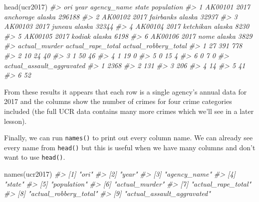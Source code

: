 \documentclass[
  12pt,
  openany]{book}
\newenvironment{Shaded}{\begin{snugshade}}{\end{snugshade}}
\newcommand{\CommentTok}[1]{\textcolor[rgb]{0.37,0.37,0.37}{\textit{#1}}}
\newcommand{\FunctionTok}[1]{\textcolor[rgb]{0,0,0}{#1}}
\newcommand{\NormalTok}[1]{#1}
\begin{document}
\begin{Shaded}
\begin{Highlighting}[]
\FunctionTok{head}\NormalTok{(ucr2017)}
\CommentTok{\#\textgreater{}       ori year agency\_name  state population}
\CommentTok{\#\textgreater{} 1 AK00101 2017   anchorage alaska     296188}
\CommentTok{\#\textgreater{} 2 AK00102 2017   fairbanks alaska      32937}
\CommentTok{\#\textgreater{} 3 AK00103 2017      juneau alaska      32344}
\CommentTok{\#\textgreater{} 4 AK00104 2017   ketchikan alaska       8230}
\CommentTok{\#\textgreater{} 5 AK00105 2017      kodiak alaska       6198}
\CommentTok{\#\textgreater{} 6 AK00106 2017        nome alaska       3829}
\CommentTok{\#\textgreater{}   actual\_murder actual\_rape\_total actual\_robbery\_total}
\CommentTok{\#\textgreater{} 1            27               391                  778}
\CommentTok{\#\textgreater{} 2            10                24                   40}
\CommentTok{\#\textgreater{} 3             1                50                   46}
\CommentTok{\#\textgreater{} 4             1                19                    0}
\CommentTok{\#\textgreater{} 5             0                15                    4}
\CommentTok{\#\textgreater{} 6             0                 7                    0}
\CommentTok{\#\textgreater{}   actual\_assault\_aggravated}
\CommentTok{\#\textgreater{} 1                      2368}
\CommentTok{\#\textgreater{} 2                       131}
\CommentTok{\#\textgreater{} 3                       206}
\CommentTok{\#\textgreater{} 4                        14}
\CommentTok{\#\textgreater{} 5                        41}
\CommentTok{\#\textgreater{} 6                        52}
\end{Highlighting}
\end{Shaded}

From these results it appears that each row is a single agency's annual data for 2017 and the columns show the number of crimes for four crime categories included (the full UCR data contains many more crimes which we'll see in a later lesson).

Finally, we can run \texttt{names()} to print out every column name. We can already see every name from \texttt{head()} but this is useful when we have many columns and don't want to use \texttt{head()}.

\begin{Shaded}
\begin{Highlighting}[]
\FunctionTok{names}\NormalTok{(ucr2017)}
\CommentTok{\#\textgreater{} [1] "ori"                      }
\CommentTok{\#\textgreater{} [2] "year"                     }
\CommentTok{\#\textgreater{} [3] "agency\_name"              }
\CommentTok{\#\textgreater{} [4] "state"                    }
\CommentTok{\#\textgreater{} [5] "population"               }
\CommentTok{\#\textgreater{} [6] "actual\_murder"            }
\CommentTok{\#\textgreater{} [7] "actual\_rape\_total"        }
\CommentTok{\#\textgreater{} [8] "actual\_robbery\_total"     }
\CommentTok{\#\textgreater{} [9] "actual\_assault\_aggravated"}
\end{Highlighting}
\end{Shaded}
\end{document}

